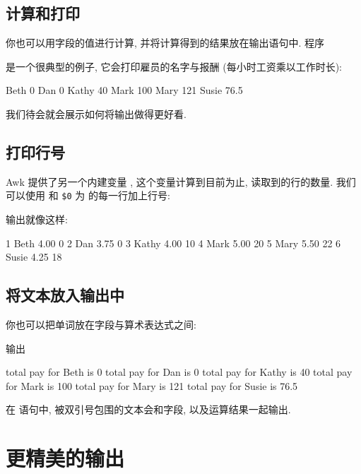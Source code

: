 \subsection{计算和打印}
\label{subsec:computing_and_printing}

你也可以用字段的值进行计算, 并将计算得到的结果放在输出语句中. 程序
是一个很典型的例子, 它会打印雇员的名字与报酬 (每小时工资乘以工作时长):
\begin{file}
    Beth 0
    Dan 0
    Kathy 40
    Mark 100
    Mary 121
    Susie 76.5
\end{file}
我们待会就会展示如何将输出做得更好看.

\subsection{打印行号}
\label{subsec:printing_line_numbers}

Awk 提供了另一个内建变量 \nr, 这个变量计算到目前为止, 读取到的行的数量.
我们可以使用 \nr 和 \verb'$0' 为  的每一行加上行号:
输出就像这样:
\begin{file}
    1 Beth    4.00    0
    2 Dan     3.75    0
    3 Kathy   4.00    10
    4 Mark    5.00    20
    5 Mary    5.50    22
    6 Susie   4.25    18
\end{file}

\subsection{将文本放入输出中}
\label{subsec:putting_text_in_the_output}

你也可以把单词放在字段与算术表达式之间:
输出
\begin{file}
    total pay for Beth is 0
    total pay for Dan is 0
    total pay for Kathy is 40
    total pay for Mark is 100
    total pay for Mary is 121
    total pay for Susie is 76.5
\end{file}
在 \print 语句中, 被双引号包围的文本会和字段, 以及运算结果一起输出.

\section{更精美的输出}
\label{sec:fancier_output}


